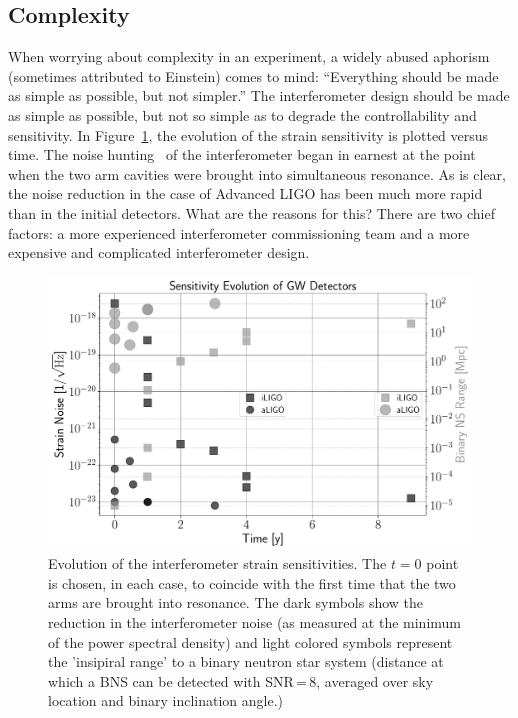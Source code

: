 \subsection{Complexity}
\label{s:IDC:Complex}
When worrying about complexity in an experiment, a widely abused
aphorism (sometimes attributed to Einstein) comes to mind:
``Everything should be made as simple as possible, but not simpler.''
The interferometer design should be made as simple as possible, but not so simple as to degrade the controllability and sensitivity.
In Figure~\ref{fig:IDC:SensEvo}, the evolution of the strain sensitivity is plotted
versus time. The noise hunting~\cite{Rana:PhD} of the interferometer began in earnest at the
point when the two arm cavities were brought into simultaneous resonance. As is
clear, the noise reduction in the case of Advanced LIGO has been much more rapid
than in the initial detectors. What are the reasons for this? There are two chief
factors: a more experienced interferometer commissioning team and a more expensive
and complicated interferometer design.

\begin{figure}[h]
\centering
\includegraphics[width=\columnwidth]{Figures/NoiseProgComp.pdf}
\caption{Evolution of the interferometer strain sensitivities. The $t = 0$
  point is chosen, in each case, to coincide with the first time that the
  two arms are brought into resonance. The dark symbols show the reduction in the interferometer noise (as measured at the minimum of the power spectral density) and light colored symbols represent the 'insipiral range' to a binary neutron star system (distance at which a BNS can be detected with SNR\,=\,8, averaged over sky location and binary inclination angle.)}
\label{fig:IDC:SensEvo}
\end{figure}

